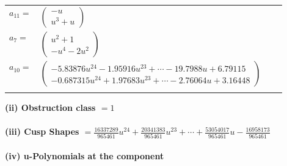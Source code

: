 \documentclass[1p]{elsarticle_modified}
\theoremstyle{definition}
\begin{document}
\begin{tabular}{m{7pt} m{180pt} m{7pt} m{180pt} }
\flushright $a_{11}=$&$\begin{pmatrix}- u\\u^3+u\end{pmatrix}$ \\
\flushright $a_{7}=$&$\begin{pmatrix}u^2+1\\- u^4-2 u^2\end{pmatrix}$ \\
\flushright $a_{10}=$&$\begin{pmatrix}-5.83876 u^{24}-1.95916 u^{23}+\cdots-19.7988 u+6.79115\\-0.687315 u^{24}+1.97683 u^{23}+\cdots-2.76064 u+3.16448\end{pmatrix}$\\&\end{tabular}
\flushleft \textbf{(ii) Obstruction class $= 1$}\\~\\
\flushleft \textbf{(iii) Cusp Shapes $= \frac{16337289}{965461} u^{24}+\frac{20341383}{965461} u^{23}+\cdots+\frac{53054017}{965461} u-\frac{16958173}{965461}$}\\~\\
\newpage\renewcommand{\arraystretch}{1}
\flushleft \textbf{(iv) u-Polynomials at the component}\newline \\
\end{document}
